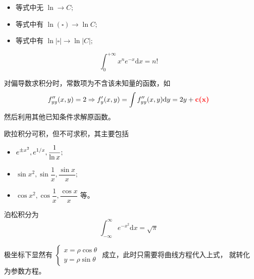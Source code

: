 \begin{Appendices}

\begin{itemize}
    \item 等式中无 $ \ln \rightarrow C;  $ 
    \item 等式中有 $ \ln (\square) \rightarrow \ln C; $ 
    \item 等式中有 $ \ln |\square| \rightarrow \ln |C|; $ 
\end{itemize}


$$
    \int_0^{+\infty} x^n e^{-x}\mathrm{d}x = n!
$$ 


对偏导数求积分时，常数项为不含该未知量的函数，如
\begin{equation*}
    \begin{aligned}
        f^{\prime\prime}_{yy}(x,y) = 2 \Rightarrow
        f'_y(x,y) = \int f^{\prime\prime}_{yy}(x,y) \mathrm{d}y
        = 2y + \textcolor{red}{\textbf{c(x)}}
    \end{aligned}
\end{equation*}
然后利用其他已知条件求解原函数。


欧拉积分可积，但不可求积，其主要包括
\begin{itemize}
    \item $ \displaystyle e^{\pm x^2},e^{1/x},\dfrac{1}{\ln x}; $ 
    \item $ \sin x^2,\sin \dfrac{1}{x}, \dfrac{\sin x}{x}; $ 
    \item $ \cos x^2,\cos \dfrac{1}{x}, \dfrac{\cos x}{x} $ 等。
\end{itemize}

泊松积分为
$$
    \int_{-\infty}^\infty e^{-x^2}\mathrm{d}x = \sqrt{\pi}    
$$ 


极坐标下显然有 $ \left\{\begin{matrix}
    x = \rho \cos \theta \\ y = \rho \sin \theta
\end{matrix}\right. $ 成立，此时只需要将曲线方程代入上式，
就转化为参数方程。

\end{Appendices}